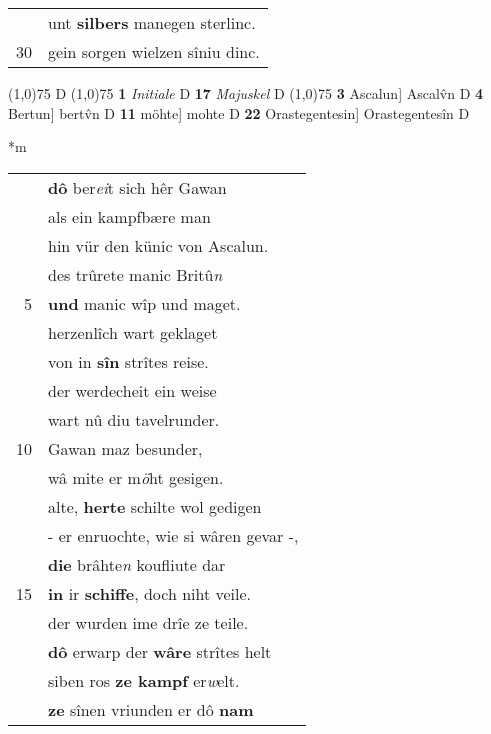 \documentclass[8pt,a4paper,notitlepage]{article}
\begin{document}
\begin{table}[ht]
\begin{minipage}[t]{0.5\linewidth}
\begin{tabular}{rl}
 & unt \textbf{silbers} manegen sterlinc.\\ 
30 & gein sorgen wielzen sîniu dinc.\\ 
\end{tabular}
\scriptsize
\line(1,0){75} \newline
D \newline
\line(1,0){75} \newline
\textbf{1} \textit{Initiale} D  \textbf{17} \textit{Majuskel} D  \newline
\line(1,0){75} \newline
\textbf{3} Ascalun] Ascalv̂n D \textbf{4} Bertun] bertv̂n D \textbf{11} möhte] mohte D \textbf{22} Orastegentesin] Orastegentesîn D \newline
\end{minipage}
\hspace{0.5cm}
\begin{minipage}[t]{0.5\linewidth}
\small
\begin{center}*m
\end{center}
\begin{tabular}{rl}
 & \textbf{dô} ber\textit{ei}t sich hêr Gawan\\ 
 & als ein kampfbære man\\ 
 & hin vür den künic von Ascalun.\\ 
 & des trûrete manic Britû\textit{n}\\ 
5 & \textbf{und} manic wîp und maget.\\ 
 & herzenlîch wart geklaget\\ 
 & von in \textbf{sîn} strîtes reise.\\ 
 & der werdecheit ein weise\\ 
 & wart nû diu tavelrunder.\\ 
10 & Gawan maz besunder,\\ 
 & wâ mite er m\textit{ö}ht gesigen.\\ 
 & alte, \textbf{herte} schilte wol gedigen\\ 
 & - er enruochte, wie si wâren gevar -,\\ 
 & \textbf{die} brâhte\textit{n} koufliute dar\\ 
15 & \textbf{in} ir \textbf{schiffe}, doch niht veile.\\ 
 & der wurden ime drîe ze teile.\\ 
 & \textbf{dô} erwarp der \textbf{wâre} strîtes helt\\ 
 & siben ros \textbf{ze kampf} er\textit{w}elt.\\ 
 & \textbf{ze} sînen vriunden er dô \textbf{nam}\\ 

\end{tabular}
\end{minipage}
\end{table}
\end{document}
